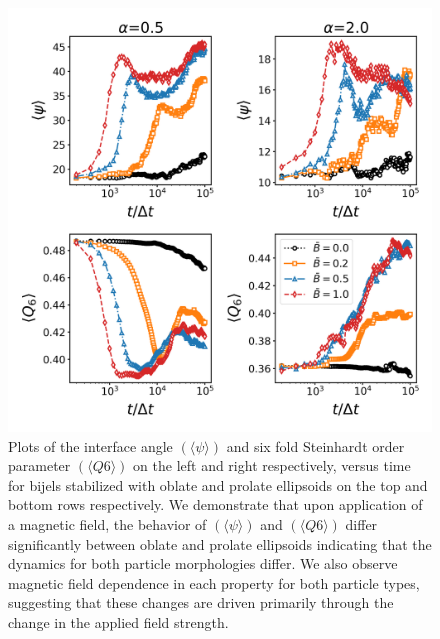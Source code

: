 \begin{figure} 
\centering 
\includegraphics[scale=0.3]{../figures/results/paper2/interface_angle-nint-field_on.png} 
\caption{Plots of the interface angle $(\langle \psi \rangle)$ and six fold Steinhardt order parameter $(\langle Q6 \rangle)$ on the left and right respectively, 
         versus time for bijels stabilized with oblate and prolate ellipsoids on the top and bottom rows respectively. We demonstrate that upon application 
         of a magnetic field, the behavior of $(\langle \psi \rangle)$ and $(\langle Q6 \rangle)$ differ significantly between oblate and prolate ellipsoids 
         indicating that the dynamics for both particle morphologies differ. We also observe magnetic field dependence in each property for both particle types, 
         suggesting that these changes are driven primarily through the change in the applied field strength.} 
\label{fig:interface_angle-nint-field_on} 
\end{figure}

